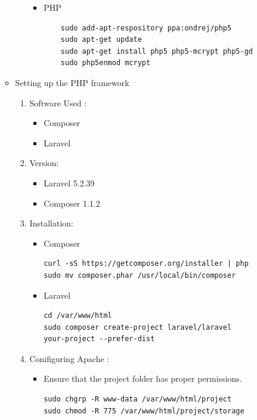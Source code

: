 \documentclass[a4paper,12pt,oneside]{book}
\begin{document}
\begin{enumerate}
\begin{itemize}
\begin{enumerate}
\begin{itemize}
							\item PHP 
							\begin{verbatim}
    sudo add-apt-respository ppa:ondrej/php5
    sudo apt-get update
    sudo apt-get install php5 php5-mcrypt php5-gd
    sudo php5enmod mcrypt
							\end{verbatim}
						\end{itemize}
  				\end{enumerate}
  			\item  Setting up the PHP framework
  				\begin{enumerate}
  					\item Software Used :
  						\begin{itemize}
  							\item Composer 
  							\item Laravel
  						\end{itemize}
  					\item Version:
  						\begin{itemize}
  							\item Laravel 5.2.39
  							\item Composer 1.1.2
  						\end{itemize}
  							
  					\item Installation:
  						\begin{itemize}
  							\item Composer 
      							\begin{verbatim}
curl -sS https://getcomposer.org/installer | php
sudo mv composer.phar /usr/local/bin/composer
      							\end{verbatim}
  							\item Laravel 
  							    \begin{verbatim}
cd /var/www/html
sudo composer create-project laravel/laravel 
your-project --prefer-dist
  							    \end{verbatim}
  						\end{itemize}
  					\item Conifiguring Apache :
  						\begin{itemize}
  							\item Ensure that the project folder has proper permissions. 
  							    \begin{verbatim}
sudo chgrp -R www-data /var/www/html/project
sudo chmod -R 775 /var/www/html/project/storage
  							    \end{verbatim}
  						

\end{itemize}
\end{enumerate}
\end{itemize}
\end{enumerate}
\end{document}
